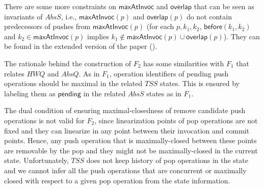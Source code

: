 \begin{itemize}
\vspace{-2mm}
\end{itemize}
There are some more constraints on $\mathsf{maxAtInvoc}$ and $\mathsf{overlap}$ that can be seen as invariants of $AbsS$, i.e., $\mathsf{maxAtInvoc}(p)$ and $\mathsf{overlap}(p)$ do not contain predecessors of pushes from $\mathsf{maxAtInvoc}(p)$ (for each $p, k_1, k_2$, $\mathsf{before}(k_1, k_2)$ and $k_2 \in \mathsf{maxAtInvoc}(p)$ implies $k_1\not\in \mathsf{maxAtInvoc}(p)\cup \mathsf{overlap}(p)$). They can be found in the extended version of the paper (\cite{extended}).

The rationale behind the construction of $F_2$ has some similarities with $F_1$ that relates $\mathit{HWQ}$ and $AbsQ$. As in $F_1$, operation identifiers of pending push operations should be maximal in the related $\mathit{TSS}$ states. This is ensured by labeling them as $\mathsf{pending}$ in the related $AbsS$ states as in $F_1$. 

The dual condition of ensuring maximal-closedness of remove candidate push operations is not valid for $F_2$, since linearization points of pop operations are not fixed and they can linearize in any point between their invocation and commit points. Hence, any push operation that is maximally-closed between these points are removable by the pop and they might not be maximally-closed in the current state. Unfortunately, $\mathit{TSS}$ does not keep history of pop operations in the state and we cannot infer all the push operations that are concurrent or maximally closed with respect to a given pop operation from the state information.

